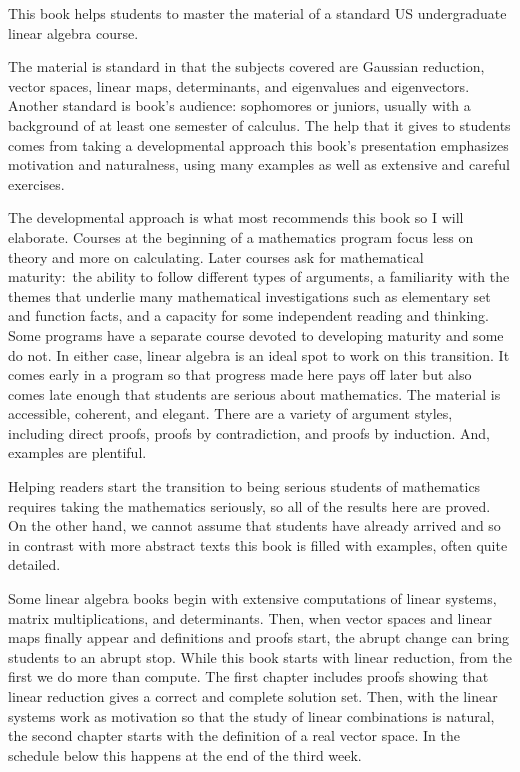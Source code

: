 \bigskip
\vspace*{1.25in plus .2in minus .1in}
\vspace*{.4in plus .1in minus .05in}
\par\noindent
This book helps students to master the material of a standard 
US undergraduate linear algebra course.

The material is standard in that the subjects covered are
Gaussian reduction, 
vector spaces, linear maps,
determinants, and eigenvalues and eigenvectors.
Another standard is book's audience:
sophomores or juniors, usually with a background 
of at least one semester of calculus. 
The help that it gives to students comes from taking a developmental 
approach\Dash 
this book's presentation emphasizes motivation and naturalness, 
using many examples as well as extensive and careful exercises.

The developmental approach is what most recommends this book
so I will elaborate.
Courses at the beginning of a mathematics program
focus less on theory and more on calculating.
Later courses
ask for mathematical maturity:~the ability to follow different 
types of arguments, 
a familiarity with
the themes that underlie many mathematical investigations such as
elementary set and function facts,
and a capacity for some independent reading and thinking.
Some programs have a separate course devoted to developing maturity and
some do not. 
In either case, linear algebra is an ideal spot to work on this transition.
It comes early in a program so that progress made here pays off later
but also comes late enough that
students are serious about mathematics.
The material is accessible, coherent, and elegant.
There are a variety of argument styles, including 
direct proofs, proofs by
contradiction, and proofs by induction.
And, examples are plentiful.

Helping readers start the transition to being serious students of 
mathematics
requires taking the mathematics seriously, so
all of the results here are proved.
On the other hand, we cannot
assume that students have already arrived
and so 
in contrast with more abstract texts 
this book is filled with examples,
often quite detailed.

Some linear algebra books
begin with extensive computations of linear systems, 
matrix multiplications, 
and determinants.
Then, when 
vector spaces and linear maps finally appear
and definitions and proofs start, the abrupt change
can bring students to an abrupt stop.
While this book starts with
linear reduction, from the first
we do more than compute.
The first chapter
includes proofs showing that linear reduction gives a correct and
complete solution set.
Then, with the linear systems work as motivation
so that the study of linear combinations is natural,
the second chapter starts with the definition of a real vector space.
In the schedule below this happens at the end of the third week.

